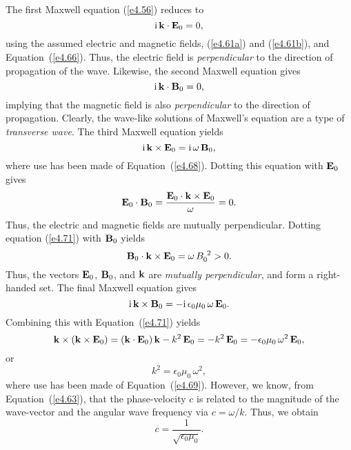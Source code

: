 The first Maxwell equation (\ref{e4.56}) reduces to
\begin{equation}\label{e4.69}
{\rm i}\, {\bf k} \cdot {\bf E}_0  = 0,
\end{equation}
using the assumed electric and magnetic fields, (\ref{e4.61a}) and (\ref{e4.61b}), and
Equation~(\ref{e4.66}). Thus, the electric field is {\em perpendicular}\/ to the direction
of propagation of the wave. Likewise, the second Maxwell equation gives
\begin{equation}
{\rm i}\,{\bf k} \cdot {\bf B}_0 = 0,
\end{equation}
implying that the magnetic field is also {\em perpendicular}\/ to the direction of
propagation. Clearly, the wave-like solutions of Maxwell's equation
are a type of {\em transverse wave}. The third Maxwell equation yields
\begin{equation}\label{e4.71}
{\rm i}\,{\bf k}\times {\bf E}_0 = {\rm i}\, \omega\, {\bf B}_0,
\end{equation}
where use has been made of Equation~(\ref{e4.68}). Dotting this equation with ${\bf E}_0$
gives
\begin{equation}
{\bf E}_0 \cdot {\bf B}_0 = \frac{
{\bf E}_0 \cdot {\bf k} \times {\bf E}_0 }{ \omega }= 0.
\end{equation}
Thus, the electric and magnetic fields are mutually perpendicular. Dotting
equation (\ref{e4.71}) with ${\bf B}_0$ yields 
\begin{equation}
{\bf B}_0 \cdot {\bf k}  \times{\bf E}_0 = \omega\,B_0^{~2} > 0.
\end{equation}
Thus, the vectors ${\bf E}_0$, ${\bf B}_0$, and ${\bf k}$ are {\em mutually
perpendicular}, and form a right-handed set. The final Maxwell equation
gives
\begin{equation}
{\rm i}\, {\bf k}\times{\bf B}_0 = -{\rm i}\,\epsilon_0\mu_0 \,\omega\,
{\bf E}_0.
\end{equation}
Combining this with Equation~(\ref{e4.71}) yields
\begin{equation}
{\bf k}\times ({\bf k} \times {\bf E}_0) = 
({\bf k} \cdot {\bf E}_0)\,{\bf k} - k^2\,{\bf E}_0 =-k^2\,{\bf E}_0
= - \epsilon_0 \mu_0\,\omega^2\, {\bf E}_0,
\end{equation}
or
\begin{equation}
k^2 = \epsilon_0 \mu_0 \,\omega^2,
\end{equation}
where use has been made of Equation~(\ref{e4.69}). However, we know, from Equation~(\ref{e4.63}), that
the phase-velocity $c$ is related to the magnitude of the wave-vector and the
angular wave frequency via $c = \omega/k$. Thus, we obtain
\begin{equation}\label{e4.77}
c = \frac{1}{\sqrt{\epsilon_0 \mu_0}}.
\end{equation}

